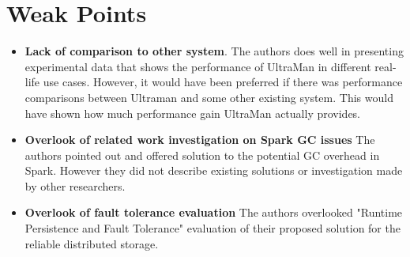 \documentclass[10pt]{proc}
\begin{document}
\section{Weak Points}
\begin{itemize}
 \item \textbf{Lack of comparison to other system}. The authors does well in presenting experimental data that shows the performance of UltraMan in different real-life use cases. However, it would have been preferred if there was performance comparisons between Ultraman and some other existing system. This would have shown how much performance gain UltraMan actually provides.
 \item \textbf{Overlook of related work investigation on Spark GC issues} The authors pointed out and offered solution to the potential GC overhead in Spark. However they did not describe existing solutions or investigation made by other researchers.
 \item \textbf{Overlook of fault tolerance evaluation} The authors overlooked "Runtime Persistence and Fault Tolerance" evaluation of their proposed solution for the reliable distributed storage.
\end{itemize}
\end{document}
